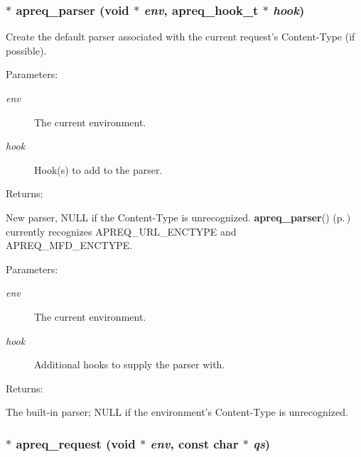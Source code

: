 \subsubsection{$\ast$ apreq\_\-parser ({\bf void} $\ast$ {\em env}, {\bf apreq\_\-hook\_\-t} $\ast$ {\em hook})}\label{group__params_a21}


Create the default parser associated with the current request's Content-Type (if possible). \begin{Desc}
\item[Parameters: ]\par
\begin{description}
\item[{\em 
env}]The current environment. \item[{\em 
hook}]Hook(s) to add to the parser. \end{description}
\end{Desc}
\begin{Desc}
\item[Returns: ]\par
New parser, NULL if the Content-Type is unrecognized. {\bf apreq\_\-parser}() {\rm (p.\,\pageref{group__params_a21})} currently recognizes APREQ\_\-URL\_\-ENCTYPE and APREQ\_\-MFD\_\-ENCTYPE.\end{Desc}
\begin{Desc}
\item[Parameters: ]\par
\begin{description}
\item[{\em 
env}]The current environment. \item[{\em 
hook}]Additional hooks to supply the parser with. \end{description}
\end{Desc}
\begin{Desc}
\item[Returns: ]\par
The built-in parser; NULL if the environment's Content-Type is unrecognized. \end{Desc}
\subsubsection{$\ast$ apreq\_\-request ({\bf void} $\ast$ {\em env}, const char $\ast$ {\em qs})}\label{group__params_a5}


